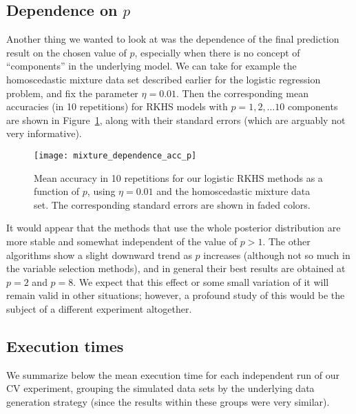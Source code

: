 \subsection*{Dependence on \(p\)}

Another thing we wanted to look at was the dependence of the final prediction result on the chosen value of \(p\), especially when there is no concept of ``components'' in the underlying model. We can take for example the homoscedastic mixture data set described earlier for the logistic regression problem, and fix the parameter \(\eta=0.01\). Then the corresponding mean accuracies (in 10 repetitions) for RKHS models with \(p=1,2,\dots 10\) components are shown in Figure~\ref{fig:dependence_acc_p}, along with their standard errors (which are arguably not very informative).

\begin{figure}[ht!]
  \centering
  \texttt{[image: mixture\_dependence\_acc\_p]}
  \caption{Mean accuracy in 10 repetitions for our logistic RKHS methods as a function of \(p\), using \(\eta=0.01\) and the homoscedastic mixture data set. The corresponding standard errors are shown in faded colors.}\label{fig:dependence_acc_p}
\end{figure}

It would appear that the methods that use the whole posterior distribution are more stable and somewhat independent of the value of \(p>1\). The other algorithms show a slight downward trend as \(p\) increases (although not so much in the variable selection methods), and in general their best results are obtained at \(p=2\) and \(p=8\). We expect that this effect or some small variation of it will remain valid in other situations; however, a profound study of this would be the subject of a different experiment altogether.

\subsection*{Execution times}

We summarize below the mean execution time for each independent run of our CV experiment, grouping the simulated data sets by the underlying data generation strategy (since the results within these groups were very similar).

